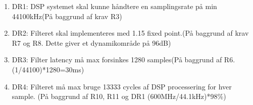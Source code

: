 \begin{enumerate}
	\item DR1: DSP systemet skal kunne håndtere en samplingsrate på min 44100kHz(På baggrund af krav R3) 
	
	\item DR2: Filteret skal implementeres med 1.15 fixed point.(På baggrund af krav R7 og R8. Dette giver et dynamikområde på 96dB)
	
	\item DR3: Filter latency må max forsinkes 1280 samples(På baggrund af R6. (1/44100)*1280=30ms)
	
	\item DR4: Filteret må max bruge 13333 cycles af DSP processering for hver sample. (På baggrund af R10, R11 og DR1 (600MHz/44.1kHz)*98\%)
	
\end{enumerate}